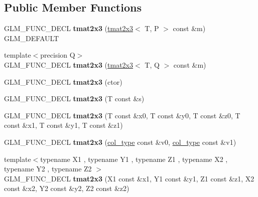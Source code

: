 \subsection*{Public Member Functions}
\begin{DoxyCompactItemize}
\item 
\hypertarget{structglm_1_1tmat2x3_a06dcdb176f656e5b401cb6361484d665}{G\-L\-M\-\_\-\-F\-U\-N\-C\-\_\-\-D\-E\-C\-L {\bfseries tmat2x3} (\hyperlink{structglm_1_1tmat2x3}{tmat2x3}$<$ T, P $>$ const \&m) G\-L\-M\-\_\-\-D\-E\-F\-A\-U\-L\-T}\label{structglm_1_1tmat2x3_a06dcdb176f656e5b401cb6361484d665}

\item 
\hypertarget{structglm_1_1tmat2x3_ae12411a80e806874d766c81fcb5b55b3}{{\footnotesize template$<$precision Q$>$ }\\G\-L\-M\-\_\-\-F\-U\-N\-C\-\_\-\-D\-E\-C\-L {\bfseries tmat2x3} (\hyperlink{structglm_1_1tmat2x3}{tmat2x3}$<$ T, Q $>$ const \&m)}\label{structglm_1_1tmat2x3_ae12411a80e806874d766c81fcb5b55b3}

\item 
\hypertarget{structglm_1_1tmat2x3_a5794d7160fb87876991d92998b87acea}{G\-L\-M\-\_\-\-F\-U\-N\-C\-\_\-\-D\-E\-C\-L {\bfseries tmat2x3} (ctor)}\label{structglm_1_1tmat2x3_a5794d7160fb87876991d92998b87acea}

\item 
\hypertarget{structglm_1_1tmat2x3_acfbdd394a778990c117652522405b13b}{G\-L\-M\-\_\-\-F\-U\-N\-C\-\_\-\-D\-E\-C\-L {\bfseries tmat2x3} (T const \&s)}\label{structglm_1_1tmat2x3_acfbdd394a778990c117652522405b13b}

\item 
\hypertarget{structglm_1_1tmat2x3_a2539bd7b19fcd5018b30c0f83f1f14ec}{G\-L\-M\-\_\-\-F\-U\-N\-C\-\_\-\-D\-E\-C\-L {\bfseries tmat2x3} (T const \&x0, T const \&y0, T const \&z0, T const \&x1, T const \&y1, T const \&z1)}\label{structglm_1_1tmat2x3_a2539bd7b19fcd5018b30c0f83f1f14ec}

\item 
\hypertarget{structglm_1_1tmat2x3_a04e3901c95b4f870b28e696f2a966771}{G\-L\-M\-\_\-\-F\-U\-N\-C\-\_\-\-D\-E\-C\-L {\bfseries tmat2x3} (\hyperlink{structglm_1_1tvec3}{col\-\_\-type} const \&v0, \hyperlink{structglm_1_1tvec3}{col\-\_\-type} const \&v1)}\label{structglm_1_1tmat2x3_a04e3901c95b4f870b28e696f2a966771}

\item 
\hypertarget{structglm_1_1tmat2x3_af0c4d0bfd54a85de217e347720c922c0}{{\footnotesize template$<$typename X1 , typename Y1 , typename Z1 , typename X2 , typename Y2 , typename Z2 $>$ }\\G\-L\-M\-\_\-\-F\-U\-N\-C\-\_\-\-D\-E\-C\-L {\bfseries tmat2x3} (X1 const \&x1, Y1 const \&y1, Z1 const \&z1, X2 const \&x2, Y2 const \&y2, Z2 const \&z2)}\label{structglm_1_1tmat2x3_af0c4d0bfd54a85de217e347720c922c0}


\end{DoxyCompactItemize}
